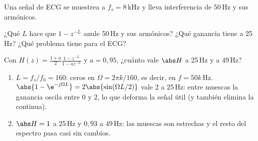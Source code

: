\documentclass[11pt,a4paper]{scrartcl}
\begin{document}
\begin{ejercicio}
  Una señal de ECG se muestrea a $f_s=8$\,kHz y lleva interferencia de 50\,Hz y sus armónicos.
  \begin{incisos}[1]
    \item ¿Qué $L$ hace que $1-z^{-L}$ anule 50\,Hz y sus armónicos? ¿Qué ganancia tiene a 25\,Hz? ¿Qué problema tiene para el ECG?
    \item Con $H(z)=\frac{1+a}{2}\frac{1-z^{-L}}{1-az^{-L}}$ y $a=0{,}95$, ¿cuánto vale $\abs H$ a 25\,Hz y a 49\,Hz?
  \end{incisos}
\end{ejercicio}
\begin{solucion}
  \begin{enumerate}[label=\alph*)]
    \item $L=f_s/f_0=160$: ceros en $\Omega=2\pi k/160$, es decir, en $f=50k$\,Hz. $\abs{1-\e^{-j\Omega L}}=2\abs{\sin(\Omega L/2)}$ vale 2 a 25\,Hz: entre muescas la ganancia oscila entre 0 y 2, lo que deforma la señal útil (y también elimina la continua).
    \item $\abs H=1$ a 25\,Hz y $0{,}93$ a 49\,Hz: las muescas son estrechas y el resto del espectro pasa casi sin cambios.
  \end{enumerate}
\end{solucion}
\end{document}
